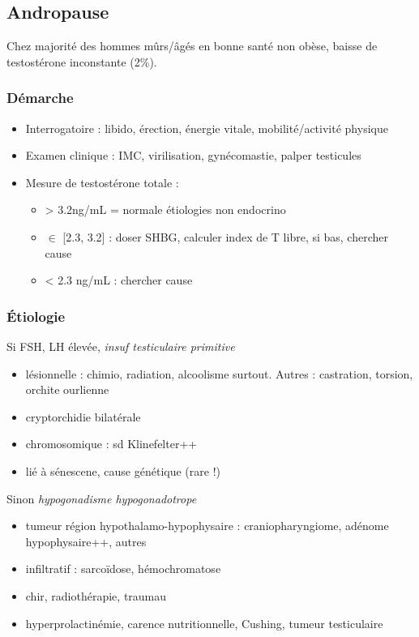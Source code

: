 \documentclass[11pt]{article}
\begin{document}
\subsection{Andropause}
\label{sec:org2fcc027}
Chez majorité des hommes mûrs/âgés en bonne santé non obèse, baisse de
testostérone inconstante (2\%).

\subsubsection{Démarche}
\label{sec:org3e7634e}
\begin{itemize}
\item Interrogatoire : libido, érection, énergie vitale, mobilité/activité physique
\item Examen clinique : IMC, virilisation, gynécomastie, palper testicules
\item Mesure de testostérone totale :
\begin{itemize}
\item > 3.2ng/mL = normale \thus étiologies non endocrino
\item \(\in\) [2.3, 3.2] : doser SHBG, calculer index de T libre, si bas, chercher cause
\item < 2.3 ng/mL : chercher cause
\end{itemize}
\end{itemize}
\subsubsection{Étiologie}
\label{sec:orgf218ce8}
Si FSH, LH élevée, \emph{insuf testiculaire primitive} 
\begin{itemize}
\item lésionnelle : chimio, radiation, alcoolisme surtout. Autres : castration,
torsion, orchite ourlienne
\item cryptorchidie bilatérale
\item chromosomique : sd Klinefelter++
\item lié à sénescene, cause génétique (rare !)
\end{itemize}
Sinon \emph{hypogonadisme hypogonadotrope}
\begin{itemize}
\item tumeur région hypothalamo-hypophysaire : craniopharyngiome, adénome
hypophysaire++, autres
\item infiltratif : sarcoïdose, hémochromatose
\item chir, radiothérapie, traumau
\item hyperprolactinémie, carence nutritionnelle, Cushing, tumeur testiculaire
\end{itemize}
\end{document}
